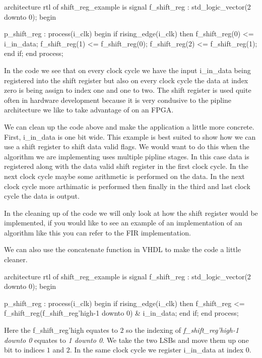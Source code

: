 \begin{VHDLlisting}[tabsize=4]
architecture rtl of shift\_reg\_example is
	signal f\_shift\_reg : std\_logic\_vector(2 downto 0);
begin

p\_shift\_reg : process(i\_clk)
begin
	if rising\_edge(i\_clk) then
		f\_shift\_reg(0) <= i\_in\_data;
		f\_shift\_reg(1) <= f\_shift\_reg(0);
		f\_shift\_reg(2) <= f\_shift\_reg(1);
	end if;
end process;
\end{VHDLlisting}

In the code we see that on every clock cycle we have the input i\_in\_data being registered into the shift register but also on every clock cycle the data at index zero is being assign to index one and one to two. The shift register is used quite often in hardware development because it is very condusive to the pipline architecture we like to take advantage of on an \ac{FPGA}.

We can clean up the code above and make the application a little more concrete. First, i\_in\_data is one bit wide. This example is best suited to show how we can use a shift register to shift data valid flags. We would want to do this when the algorithm we are implementing uses multiple pipline stages. In this case data is registered along with the data valid shift register in the first clock cycle. In the next clock cycle maybe some arithmetic is performed on the data. In the next clock cycle more arthimatic is performed then finally in the third and last clock cycle the data is output. 

In the cleaning up of the code we will only look at how the shift register would be implemented, if you would like to see an example of an implementation of an algorithm like this you can refer to the \ac{FIR} implementation.

We can also use the concatenate function in \ac{VHDL} to make the code a little cleaner.

\begin{VHDLlisting}[tabsize=4]
architecture rtl of shift\_reg\_example is
	signal f\_shift\_reg : std\_logic\_vector(2 downto 0);
begin

p\_shift\_reg : process(i\_clk)
begin
	if rising\_edge(i\_clk) then
		f\_shift\_reg <= f\_shift\_reg(f\_shift\_reg'high-1 downto 0) & i\_in\_data;
	end if;
end process;
\end{VHDLlisting}

Here the f\_shift\_reg'high equates to $2$ so the indexing of \emph{f\_shift\_reg'high-1 downto 0} equates to \emph{1 downto 0}. We take the two \ac{LSB}s and move them up one bit to indices $1$ and $2$. In the same clock cycle we register i\_in\_data at index $0$.

